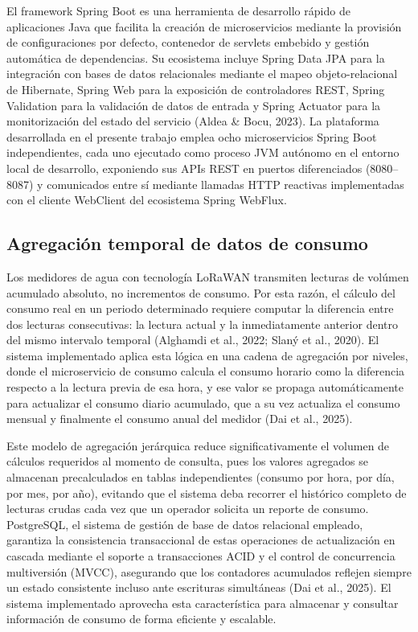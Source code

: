 \documentclass[12pt,a4paper,oneside]{report}
\begin{document}
El framework Spring Boot es una herramienta de desarrollo rápido de aplicaciones Java que facilita la creación de microservicios mediante la provisión de configuraciones por defecto, contenedor de servlets embebido y gestión automática de dependencias. Su ecosistema incluye Spring Data JPA para la integración con bases de datos relacionales mediante el mapeo objeto-relacional de Hibernate, Spring Web para la exposición de controladores REST, Spring Validation para la validación de datos de entrada y Spring Actuator para la monitorización del estado del servicio (Aldea \& Bocu, 2023). La plataforma desarrollada en el presente trabajo emplea ocho microservicios Spring Boot independientes, cada uno ejecutado como proceso JVM autónomo en el entorno local de desarrollo, exponiendo sus APIs REST en puertos diferenciados (8080--8087) y comunicados entre sí mediante llamadas HTTP reactivas implementadas con el cliente WebClient del ecosistema Spring WebFlux.

\subsection{Agregación temporal de datos de consumo}\label{agregaciuxf3n-temporal-de-datos-de-consumo}

Los medidores de agua con tecnología LoRaWAN transmiten lecturas de volúmen acumulado absoluto, no incrementos de consumo. Por esta razón, el cálculo del consumo real en un periodo determinado requiere computar la diferencia entre dos lecturas consecutivas: la lectura actual y la inmediatamente anterior dentro del mismo intervalo temporal (Alghamdi et al., 2022; Slaný et al., 2020). El sistema implementado aplica esta lógica en una cadena de agregación por niveles, donde el microservicio de consumo calcula el consumo horario como la diferencia respecto a la lectura previa de esa hora, y ese valor se propaga automáticamente para actualizar el consumo diario acumulado, que a su vez actualiza el consumo mensual y finalmente el consumo anual del medidor (Dai et al., 2025).

Este modelo de agregación jerárquica reduce significativamente el volumen de cálculos requeridos al momento de consulta, pues los valores agregados se almacenan precalculados en tablas independientes (consumo por hora, por día, por mes, por año), evitando que el sistema deba recorrer el histórico completo de lecturas crudas cada vez que un operador solicita un reporte de consumo. PostgreSQL, el sistema de gestión de base de datos relacional empleado, garantiza la consistencia transaccional de estas operaciones de actualización en cascada mediante el soporte a transacciones ACID y el control de concurrencia multiversión (MVCC), asegurando que los contadores acumulados reflejen siempre un estado consistente incluso ante escrituras simultáneas (Dai et al., 2025). El sistema implementado aprovecha esta característica para almacenar y consultar información de consumo de forma eficiente y escalable.
\end{document}
